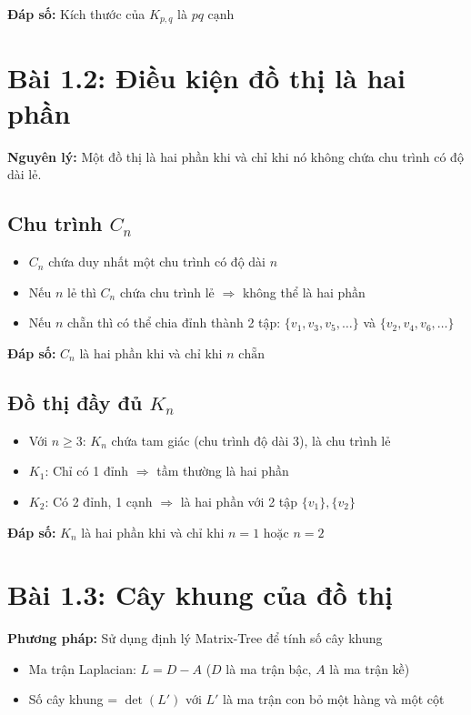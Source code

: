 \documentclass[12pt]{article}
\begin{document}
\textbf{Đáp số:} Kích thước của $K_{p,q}$ là $\boxed{pq \text{ cạnh}}$

\section{Bài 1.2: Điều kiện đồ thị là hai phần}

\textbf{Nguyên lý:} Một đồ thị là hai phần khi và chỉ khi nó không chứa chu trình có độ dài lẻ.

\subsection{Chu trình $C_n$}
\begin{itemize}
    \item $C_n$ chứa duy nhất một chu trình có độ dài $n$
    \item Nếu $n$ lẻ thì $C_n$ chứa chu trình lẻ $\Rightarrow$ không thể là hai phần
    \item Nếu $n$ chẵn thì có thể chia đỉnh thành 2 tập: $\{v_1, v_3, v_5, \ldots\}$ và $\{v_2, v_4, v_6, \ldots\}$
\end{itemize}

\textbf{Đáp số:} $C_n$ là hai phần khi và chỉ khi $\boxed{n \text{ chẵn}}$

\subsection{Đồ thị đầy đủ $K_n$}
\begin{itemize}
    \item Với $n \geq 3$: $K_n$ chứa tam giác (chu trình độ dài 3), là chu trình lẻ
    \item $K_1$: Chỉ có 1 đỉnh $\Rightarrow$ tầm thường là hai phần
    \item $K_2$: Có 2 đỉnh, 1 cạnh $\Rightarrow$ là hai phần với 2 tập $\{v_1\}, \{v_2\}$
\end{itemize}

\textbf{Đáp số:} $K_n$ là hai phần khi và chỉ khi $\boxed{n = 1 \text{ hoặc } n = 2}$

\section{Bài 1.3: Cây khung của đồ thị}

\textbf{Phương pháp:} Sử dụng định lý Matrix-Tree để tính số cây khung
\begin{itemize}
    \item Ma trận Laplacian: $L = D - A$ ($D$ là ma trận bậc, $A$ là ma trận kề)
    \item Số cây khung = $\det(L')$ với $L'$ là ma trận con bỏ một hàng và một cột
\end{itemize}
\end{document}

